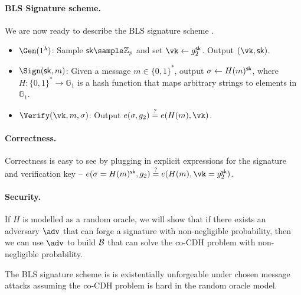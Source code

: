 \paragraph{BLS Signature scheme.} We are now ready to describe the BLS signature scheme \cite{AC:BonLynSha01}.
\begin{itemize}
    \item $\Gen(1^\lambda)$: Sample $\sk \sample \mathbb{Z}_p$ and set $\vk \gets g_2^\sk$. Output $(\vk, \sk)$.
    \item $\Sign(\sk, m)$: Given a message $m \in \{0,1\}^*$, output $\sigma \gets H(m)^{\mathsf{sk}}$, where $H: \{0,1\}^* \to \mathbb{G}_1$ is a hash function that maps arbitrary strings to elements in $\mathbb{G}_1$.
    \item $\Verify(\vk, m, \sigma)$: Output $e(\sigma, g_2) \stackrel{?}{=} e(H(m), \vk)$.
\end{itemize}

\paragraph{Correctness.} Correctness is easy to see by plugging in explicit expressions for the signature and verification key -- $e(\sigma=H(m)^\sk, g_2) \stackrel{?}{=} e(H(m), \vk=g_2^\sk)$.

\paragraph{Security.} If $H$ is modelled as a random oracle, we will show that if there exists an adversary $\adv$ that can forge a signature with non-negligible probability, then we can use $\adv$ to build $\mathcal{B}$ that can solve the co-CDH problem with non-negligible probability.

\begin{theorem}
    The BLS signature scheme is is existentially unforgeable under chosen message attacks assuming the co-CDH problem is hard in the random oracle model.
\end{theorem}

